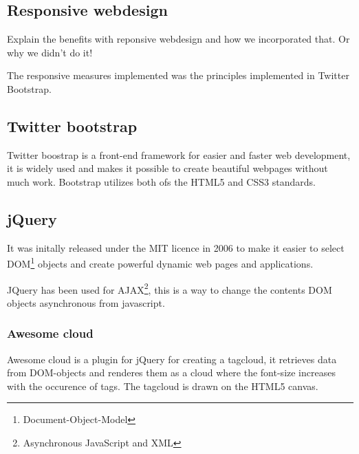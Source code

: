 \subsection{Responsive webdesign}
Explain the benefits with reponsive webdesign and how we incorporated that. Or why we didn't do it!

The responsive measures implemented was the principles implemented in Twitter Bootstrap.

\subsection{Twitter bootstrap}
Twitter boostrap is a front-end framework for easier and faster web development, it is widely used and makes it possible to create beautiful webpages without much work. Bootstrap utilizes both ofs the HTML5 and CSS3 standards.

\subsection{jQuery}
It was initally released under the MIT licence in 2006 to make it easier to select DOM\footnote{Document-Object-Model} objects and create powerful dynamic web pages and applications.

JQuery has been used for AJAX\footnote{Asynchronous JavaScript and XML}, this is a way to change the contents DOM objects asynchronous from javascript.

\subsubsection{Awesome cloud}
Awesome cloud is a plugin for jQuery for creating a tagcloud, it retrieves data from DOM-objects and renderes them as a cloud where the font-size increases with the occurence of tags. The tagcloud is drawn on the HTML5 canvas.

